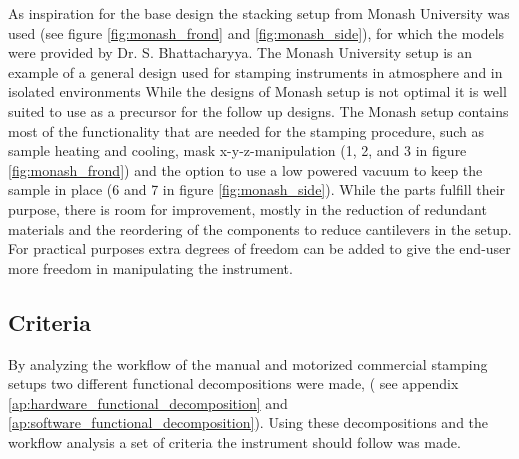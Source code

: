 \documentclass[10pt]{article}
\begin{document}
As inspiration for the base design the stacking setup from Monash University was used (see figure \ref{fig:monash_frond} and \ref{fig:monash_side}), for which the models were provided by Dr. S. Bhattacharyya. 
The Monash University setup is an example of a general design used for stamping instruments in atmosphere and in isolated environments \cite{castellanos-gomezDeterministicTransferTwodimensional2014,zhaoInexpensiveSystemDeterministic2020,gantSystemDeterministicTransfer2020}
While the designs of Monash setup is not optimal it is well suited to use as a precursor for the follow up designs. 
The Monash setup contains most of the functionality that are needed for the stamping procedure, such as sample heating and cooling, mask x-y-z-manipulation (1, 2, and 3 in figure \ref{fig:monash_frond}) and the option to use a low powered vacuum to keep the sample in place (6 and 7 in figure \ref{fig:monash_side}).
While the parts fulfill their purpose, there is room for improvement, mostly in the reduction of redundant materials and the reordering of the components to reduce cantilevers in the setup.
For practical purposes extra degrees of freedom can be added to give the end-user more freedom in manipulating the instrument.

\subsection{Criteria}
\label{ch:criteria}
By analyzing the workflow of the manual and motorized commercial stamping setups \cite{castellanos-gomezDeterministicTransferTwodimensional2014,gantSystemDeterministicTransfer2020,huangReliableExfoliationLargeArea2015,HQGrapheneSystemsDesigns,zhaoInexpensiveSystemDeterministic2020} two different functional decompositions were made, ( see appendix \ref{ap:hardware_functional_decomposition} and \ref{ap:software_functional_decomposition}). Using these decompositions and the workflow analysis a set of criteria the instrument should follow was made.
\end{document}
